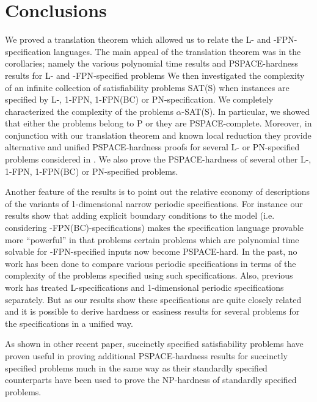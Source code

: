 \section{Conclusions}\label{sec:conclusion}

We proved a translation theorem which allowed us to relate the
{\sf L-} and {-FPN-}specification languages. 
The main appeal of the translation
theorem was in the corollaries; namely the various polynomial time
results and {\sf PSPACE}-hardness results for {\sf L}- and 
{-FPN}-specified problems
We then investigated the complexity of an infinite collection of 
satisfiability problems SAT(S) when instances are specified by 
{\sf L-, 1-FPN, 1-FPN(BC)} or {\sf PN}-specification. 
We completely characterized the
complexity of the problems $\alpha$-{\sf SAT(S)}. In particular, 
we  showed that either the problems belong to
{\sf P} or they are {\sf PSPACE}-complete. 
Moreover, in conjunction with our translation theorem and known local 
reduction they provide alternative and unified {\sf PSPACE}-hardness proofs for
several {\sf L}- or 
{\sf PN}-specified problems considered in \cite{LW92,Or82a}.
We also prove the {\sf PSPACE}-hardness of several other 
{\sf L-, 1-FPN, 1-FPN(BC)} or {\sf PN}-specified problems.  



Another feature of the results is to point out the relative 
economy of descriptions of
the variants of 1-dimensional narrow periodic specifications. For instance our
results show that adding explicit boundary conditions to the model (i.e.
considering {-FPN(BC)}-specifications) makes the specification 
language provable
more ``powerful'' in that problems certain problems which are polynomial time
solvable for {-FPN}-specified inputs now become {\sf PSPACE-hard}. 
In the past,
no work has been done to compare various periodic specifications in terms of
the complexity of the problems specified using such specifications. Also,
previous work has treated {\sf L}-specifications and 1-dimensional periodic 
specifications separately. But as our results show these specifications are
quite closely related and it is possible to derive hardness or easiness results
for several problems for the specifications in a unified way.

As shown in other recent paper, 
succinctly specified satisfiability problems have proven useful in 
proving additional {\sf PSPACE}-hardness results for 
succinctly specified problems much in the same way as their 
standardly specified counterparts have been used to prove the 
{\sf NP}-hardness of  standardly specified problems.




